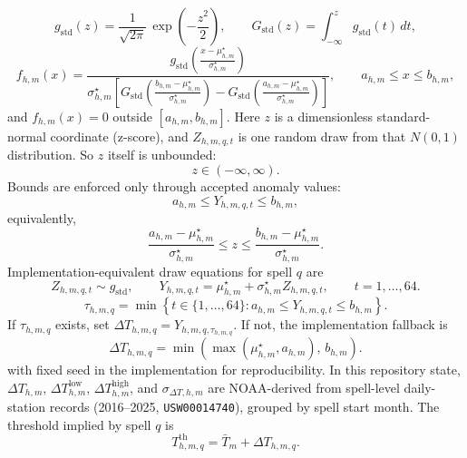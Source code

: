 \documentclass[11pt]{article}
\begin{document}
\begin{equation}
\label{eq:heatwave_std_normal_defs}
g_{\mathrm{std}}(z)=\frac{1}{\sqrt{2\pi}}\,\exp\!\left(-\frac{z^2}{2}\right),
\qquad
G_{\mathrm{std}}(z)=\int_{-\infty}^{z} g_{\mathrm{std}}(t)\,dt,
\end{equation}
\begin{equation}
\label{eq:heatwave_truncnorm_density}
f_{h,m}(x)=
\frac{
g_{\mathrm{std}}\!\left(\frac{x-\mu_{h,m}^{\star}}{\sigma_{h,m}^{\star}}\right)
}{
\sigma_{h,m}^{\star}
\left[
G_{\mathrm{std}}\!\left(\frac{b_{h,m}-\mu_{h,m}^{\star}}{\sigma_{h,m}^{\star}}\right)
-G_{\mathrm{std}}\!\left(\frac{a_{h,m}-\mu_{h,m}^{\star}}{\sigma_{h,m}^{\star}}\right)
\right]
},
\qquad
a_{h,m}\le x\le b_{h,m},
\end{equation}
and \(f_{h,m}(x)=0\) outside \([a_{h,m},b_{h,m}]\).
Here \(z\) is a dimensionless standard-normal coordinate (z-score), and \(Z_{h,m,q,t}\) is one random draw from that \(N(0,1)\) distribution.
So \(z\) itself is unbounded:
\[
z\in(-\infty,\infty).
\]
Bounds are enforced only through accepted anomaly values:
\[
a_{h,m}\le Y_{h,m,q,t}\le b_{h,m},
\]
equivalently,
\[
\frac{a_{h,m}-\mu_{h,m}^{\star}}{\sigma_{h,m}^{\star}}
\le z \le
\frac{b_{h,m}-\mu_{h,m}^{\star}}{\sigma_{h,m}^{\star}}.
\]
Implementation-equivalent draw equations for spell \(q\) are
\begin{equation}
\label{eq:heatwave_rejection_draw}
Z_{h,m,q,t}\sim g_{\mathrm{std}},\qquad
Y_{h,m,q,t}=\mu_{h,m}^{\star}+\sigma_{h,m}^{\star}Z_{h,m,q,t},\qquad t=1,\dots,64.
\end{equation}
\begin{equation}
\label{eq:heatwave_rejection_tau}
\tau_{h,m,q}=\min\left\{t\in\{1,\dots,64\}:a_{h,m}\le Y_{h,m,q,t}\le b_{h,m}\right\}.
\end{equation}
If \(\tau_{h,m,q}\) exists, set \(\Delta T_{h,m,q}=Y_{h,m,q,\tau_{h,m,q}}\). If not, the implementation fallback is
\begin{equation}
\label{eq:heatwave_rejection_fallback}
\Delta T_{h,m,q}=\min\!\left(\max\!\left(\mu_{h,m}^{\star},a_{h,m}\right),\,b_{h,m}\right).
\end{equation}
with fixed seed in the implementation for reproducibility.
In this repository state, \(\Delta T_{h,m}\), \(\Delta T_{h,m}^{\mathrm{low}}\), \(\Delta T_{h,m}^{\mathrm{high}}\), and \(\sigma_{\Delta T,h,m}\) are NOAA-derived from spell-level daily-station records (2016--2025, \texttt{USW00014740}), grouped by spell start month.
The threshold implied by spell \(q\) is
\begin{equation}
\label{eq:heatwave_threshold}
T_{h,m,q}^{\mathrm{th}}=\bar T_m+\Delta T_{h,m,q}.
\end{equation}
\end{document}
